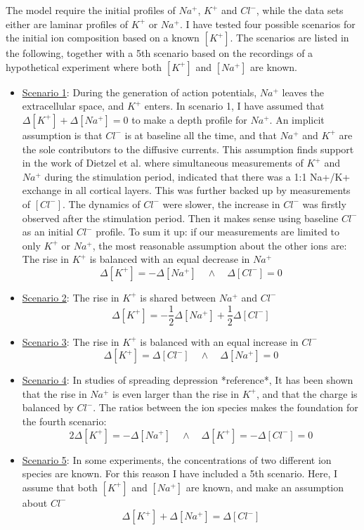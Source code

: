 \documentclass{article}
\begin{document}
The model require the initial profiles of $Na^+$, $K^+$ and $Cl^-$, while the data sets either are laminar profiles of $K^+$ or $Na^+$. I have tested four possible scenarios for the initial ion composition based on a known $[K^+]$. The scenarios are listed in the following, together with a 5th scenario based on the recordings of a hypothetical experiment where  both $[K^+]$ and $[Na^+]$ are known.

\begin{itemize}\label{Scenarios}
	\item[]\underline{Scenario 1}: During the generation of action potentials, $Na^+$ leaves the extracellular space, and $K^+$ enters. In scenario 1, I have assumed that $\Delta [K^+] + \Delta [Na^+] = 0$ to make a depth profile for $Na^+$. An implicit assumption is that $Cl^-$ is at baseline all the time, and that $Na^+$ and $K^+$ are the sole contributors to the diffusive currents. This assumption finds support in the work of Dietzel et al. \cite{Dietzel1982} where simultaneous measurements of $K^+$ and $ Na^+$ during the stimulation period, indicated that there was a 1:1 Na+/K+ exchange in all cortical layers. This was further backed up by measurements of $[Cl^-]$. The dynamics of $Cl^-$ were slower, the increase in $Cl^-$ was firstly observed after the stimulation period. Then it makes sense using baseline $Cl^-$ as an initial $Cl^-$ profile. 
To sum it up: if our measurements are limited to only $K^+$ or $Na^+$, the most reasonable assumption about the other ions are:
	The rise in $K^+$ is balanced with an equal decrease in $Na^+$
	  $$\Delta [K^+] = -\Delta [Na^+] \quad \land \quad \Delta [Cl^-] =0$$
	\item[]\underline{Scenario 2}:  The rise in $K^+$ is shared between $Na^+$ and $Cl^-$
	$$\Delta [K^+] = -\frac{1}{2} \Delta [Na^+] +\frac{1}{2} \Delta [Cl^-] $$ 
		\item[]\underline{Scenario 3}:  The rise in $K^+$ is balanced with an equal increase in $Cl^-$
	  $$\Delta [K^+] = \Delta [Cl^-] \quad \land \quad \Delta [Na^+] =0$$
	  \item[]\underline{Scenario 4}:  In studies of spreading depression *reference*, It has been shown that the rise in $Na^+$ is even larger than the rise in $K^+$, and that the charge is balanced by $Cl^-$. The ratios between the ion species makes the foundation for the fourth scenario:
	$$2\Delta [K^+] = - \Delta [Na^+] \quad \land \quad \Delta [K^+] =  -\Delta [Cl^-] =0$$ 
	\item[]\underline{Scenario 5}: In some experiments, the concentrations of two different ion species are known. For this reason I have included a 5th scenario. Here, I assume that both $[K^+]$ and $[Na^+]$ are known, and make an assumption about $Cl^-$
	$$\Delta [K^+] + \Delta [Na^+] = \Delta[Cl^-] $$
\end{itemize}
\end{document}
